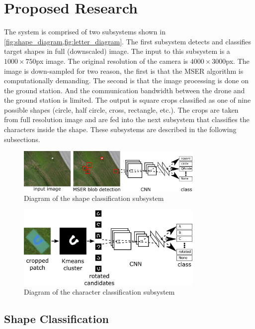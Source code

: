 \documentclass{article} %
\begin{document}
\section{Proposed Research}

The system is comprised of two subsystems shown in \cref{fig:shape_diagram,fig:letter_diagram}.
The first subsystem detects and classifies target shapes in full (downscaled) image. The
input to this subsystem is a $1000\times750$px image. The original resolution of the
camera is $4000\times3000$px. The image is down-sampled for two reason, the first is that
the MSER algorithm is computationally demanding. The second is that the image processing is done
on the ground station. And the communication bandwidth between the drone and the ground station
is limited. The output is square crops classified as one of nine possible
shapes (circle, half circle, cross, rectangle, etc.). The crops are taken from full resolution
image and are fed into the
next subsystem that classifies the characters inside the shape. These subsystems
are described in the following subsections.
\begin{figure}[h]
	\centering
	\includegraphics[width=0.8\textwidth]{diagram}
	\caption{Diagram of the shape classification subsystem}
	\label{fig:shape_diagram}
\end{figure}
\begin{figure}[h]
	\centering
	\includegraphics[width=0.8\textwidth]{letter_diagram}
	\caption{Diagram of the character classification subsystem}
	\label{fig:letter_diagram}
\end{figure}

\subsection{Shape Classification}
\label{sec:shape_class}
\end{document}
